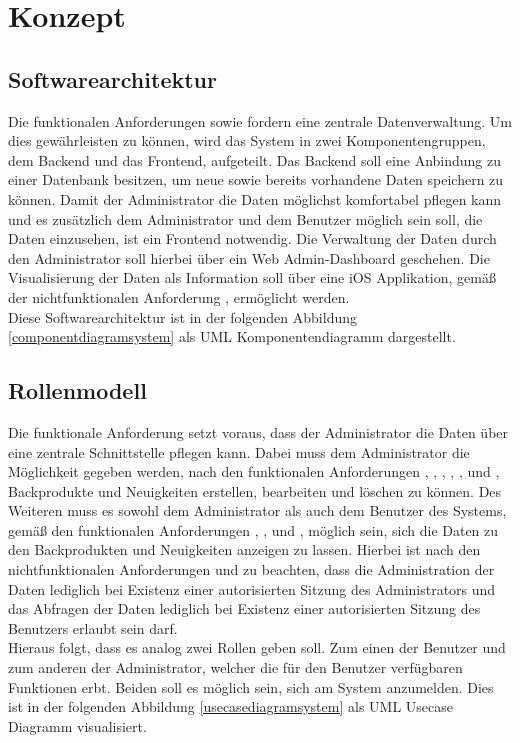 \chapter{Konzept}

\section{Softwarearchitektur} \label{softwarearchitektur}
Die funktionalen Anforderungen  sowie  fordern eine zentrale Datenverwaltung.
Um dies gewährleisten zu können, wird das System in zwei Komponentengruppen, dem Backend und das Frontend, aufgeteilt.
Das Backend soll eine Anbindung zu einer Datenbank besitzen, um neue sowie bereits vorhandene Daten speichern zu können.
Damit der Administrator die Daten möglichst komfortabel pflegen kann und es zusätzlich dem Administrator und dem Benutzer möglich sein soll, die Daten einzusehen, ist ein Frontend notwendig. Die Verwaltung der Daten durch den Administrator soll hierbei über ein Web Admin-Dashboard geschehen. Die Visualisierung der Daten als Information soll über eine iOS Applikation, gemäß der nichtfunktionalen Anforderung , ermöglicht werden.
\\
Diese Softwarearchitektur ist in der folgenden Abbildung \ref{componentdiagramsystem} als UML Komponentendiagramm dargestellt.


\newpage

\section{Rollenmodell} \label{rollenmodell}
Die funktionale Anforderung  setzt voraus, dass der Administrator die Daten über eine zentrale Schnittstelle pflegen kann. Dabei muss dem Administrator die Möglichkeit gegeben werden, nach den funktionalen Anforderungen , , , , , und , Backprodukte und Neuigkeiten erstellen, bearbeiten und löschen zu können.
Des Weiteren muss es sowohl dem Administrator als auch dem Benutzer des Systems, gemäß den funktionalen Anforderungen , ,  und , möglich sein, sich die Daten zu den Backprodukten und Neuigkeiten anzeigen zu lassen. Hierbei ist nach den nichtfunktionalen Anforderungen  und  zu beachten, dass die Administration der Daten lediglich bei Existenz einer autorisierten Sitzung des Administrators und das Abfragen der Daten lediglich bei Existenz einer autorisierten Sitzung des Benutzers erlaubt sein darf.
\\
Hieraus folgt, dass es analog zwei Rollen geben soll. Zum einen der Benutzer und zum anderen der Administrator, welcher die für den Benutzer verfügbaren Funktionen erbt. Beiden soll es möglich sein, sich am System anzumelden.
Dies ist in der folgenden Abbildung \ref{usecasediagramsystem} als UML Usecase Diagramm visualisiert.

